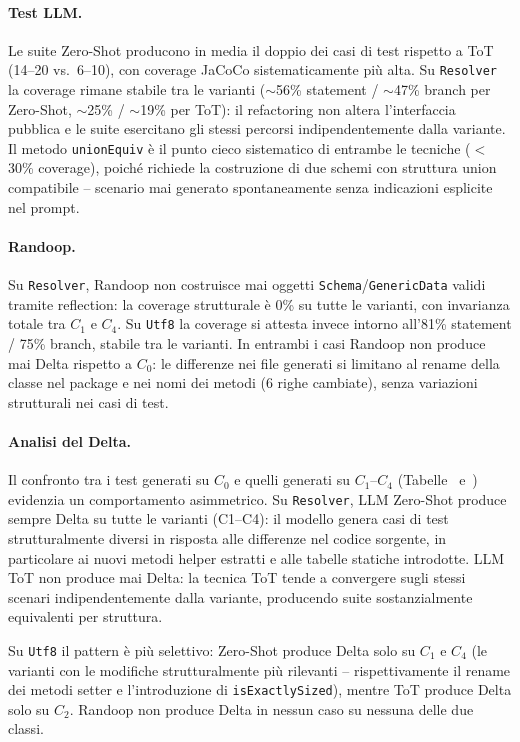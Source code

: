 \paragraph{Test LLM.}
Le suite Zero-Shot producono in media il doppio dei casi di test
rispetto a ToT (14--20 vs.\ 6--10), con coverage JaCoCo
sistematicamente più alta. Su \texttt{Resolver} la coverage rimane
stabile tra le varianti ($\sim$56\% statement / $\sim$47\% branch
per Zero-Shot, $\sim$25\% / $\sim$19\% per ToT): il refactoring non
altera l'interfaccia pubblica e le suite esercitano gli stessi
percorsi indipendentemente dalla variante. Il metodo
\texttt{unionEquiv} è il punto cieco sistematico di entrambe le
tecniche ($<$30\% coverage), poiché richiede la costruzione di due
schemi con struttura union compatibile -- scenario mai generato
spontaneamente senza indicazioni esplicite nel prompt.


\paragraph{Randoop.}
Su \texttt{Resolver}, Randoop non costruisce mai oggetti
\texttt{Schema}/\texttt{GenericData} validi tramite reflection:
la coverage strutturale è 0\% su tutte le varianti, con invarianza
totale tra $C_1$ e $C_4$. Su \texttt{Utf8} la coverage si attesta
invece intorno all'81\% statement / 75\% branch, stabile tra le
varianti. In entrambi i casi Randoop non produce mai Delta rispetto
a $C_0$: le differenze nei file generati si limitano al rename della
classe nel package e nei nomi dei metodi (6 righe cambiate), senza
variazioni strutturali nei casi di test.

\paragraph{Analisi del Delta.}
Il confronto tra i test generati su $C_0$ e quelli generati su
$C_1$--$C_4$ (Tabelle~
e~) evidenzia un comportamento asimmetrico.
Su \texttt{Resolver}, LLM Zero-Shot produce sempre Delta su tutte
le varianti (C1--C4): il modello genera casi di test strutturalmente
diversi in risposta alle differenze nel codice sorgente, in
particolare ai nuovi metodi helper estratti e alle tabelle statiche
introdotte. LLM ToT non produce mai Delta: la tecnica ToT tende a
convergere sugli stessi scenari indipendentemente dalla variante,
producendo suite sostanzialmente equivalenti per struttura.

Su \texttt{Utf8} il pattern è più selettivo: Zero-Shot produce
Delta solo su $C_1$ e $C_4$ (le varianti con le modifiche
strutturalmente più rilevanti -- rispettivamente il rename dei metodi
setter e l'introduzione di \texttt{isExactlySized}), mentre ToT
produce Delta solo su $C_2$. Randoop non produce Delta in nessun
caso su nessuna delle due classi.

